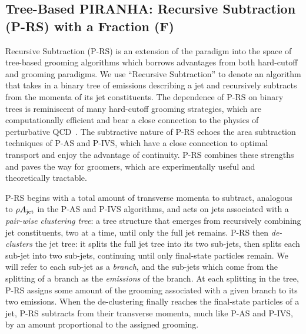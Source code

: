 \subsection{Tree-Based PIRANHA{}: Recursive Subtraction (P-RS) with a Fraction (F)}
\label{sec:rsf}

Recursive Subtraction (P-RS) is an extension of the \PIRANHA{} paradigm into the space of tree-based grooming algorithms which borrows advantages from both hard-cutoff and \PIRANHA{} grooming paradigms.
%
We use ``Recursive Subtraction'' to denote an algorithm that takes in a binary tree of emissions describing a jet and recursively subtracts from the momenta of its jet constituents.
%
The dependence of P-RS on binary trees is reminiscent of many hard-cutoff grooming strategies, which are computationally efficient and bear a close connection to the physics of perturbative QCD~\cite{Larkoski:2014wba,Collins:2011zzd}.
%
The subtractive nature of P-RS echoes the area subtraction techniques of P-AS and P-IVS, which have a close connection to optimal transport and enjoy the advantage of continuity.
%
P-RS combines these strengths and paves the way for \PIRANHA{} groomers, which are experimentally useful and theoretically tractable.

P-RS begins with a total amount of transverse momenta to subtract, analogous to \(\rho A_{\rm jet}\) in the P-AS and P-IVS algorithms, and acts on jets associated with a \textit{pair-wise clustering tree}:
%
a tree structure that emerges from recursively combining jet constituents, two at a time, until only the full jet remains.
%
P-RS then \textit{de-clusters} the jet tree:
%
it splits the full jet tree into its two sub-jets, then splits each sub-jet into two sub-jets, continuing until only final-state particles remain.
%
We will refer to each sub-jet as a \textit{branch}, and the sub-jets which come from the splitting of a branch as the \textit{emissions} of the branch.
%
At each splitting in the tree, P-RS assigns some amount of the grooming associated with a given branch to its two emissions.
%
When the de-clustering finally reaches the final-state particles of a jet, P-RS subtracts from their transverse momenta, much like P-AS and P-IVS, by an amount proportional to the assigned grooming.


